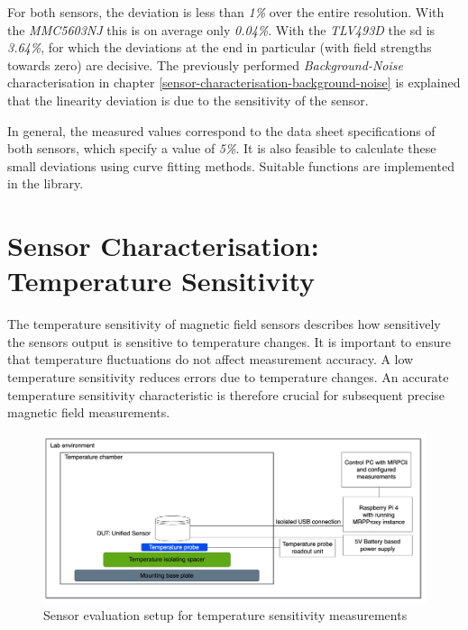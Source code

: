 For both sensors, the deviation is less than \emph{1\%} over the entire
resolution. With the \emph{MMC5603NJ} this is on average only
\emph{0.04\%}. With the \emph{TLV493D} the \gls{sd} is \emph{3.64\%},
for which the deviations at the end in particular (with field strengths
towards zero) are decisive. The previously performed
\emph{Background-Noise} characterisation in chapter
\ref{sensor-characterisation-background-noise} is explained that the
linearity deviation is due to the sensitivity of the sensor.

In general, the measured values correspond to the data sheet
specifications of both sensors, which specify a value of \emph{5\%}. It
is also feasible to calculate these small deviations using curve fitting
methods. Suitable functions are implemented in the library.

\hypertarget{sensor-characterisation-temperature-sensitivity}{%
\section{Sensor Characterisation: Temperature
Sensitivity}\label{sensor-characterisation-temperature-sensitivity}}

The temperature sensitivity of magnetic field sensors describes how
sensitively the sensors output is sensitive to temperature changes. It
is important to ensure that temperature fluctuations do not affect
measurement accuracy. A low temperature sensitivity reduces errors due
to temperature changes. An accurate temperature sensitivity
characteristic is therefore crucial for subsequent precise magnetic
field measurements.

\begin{figure}
\centering
\includegraphics{./generated_images/border_Sensor_evaluation_setup_for_temperature_sensitivity_measurements.png}
\caption{Sensor evaluation setup for temperature sensitivity
measurements
\label{Sensor_evaluation_setup_for_temperature_sensitivity_measurements.png}}
\end{figure}


